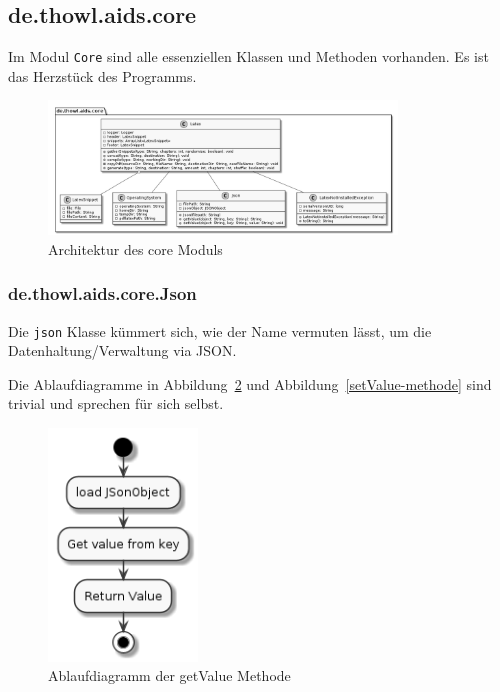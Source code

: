 \documentclass[stu, a4paper, 11pt, floatsintext]{apa7}
\begin{document}
\subsection{de.thowl.aids.core}
\noindent Im Modul \texttt{Core} sind alle essenziellen Klassen und Methoden vorhanden.
Es ist das Herzstück des Programms.

\begin{figure}[!htbp]
\centering
\includegraphics[width=350px]{../technical_documentation/diagramm/uml/flowcharts/core/core.png}
\caption{\label{Core Architektur}Architektur des core Moduls}
\end{figure}

\subsubsection{de.thowl.aids.core.Json}
\noindent Die \texttt{json} Klasse kümmert sich, wie der Name vermuten lässt, um die Datenhaltung/Verwaltung via JSON.

Die Ablaufdiagramme in Abbildung~\ref{getValue-methode} und Abbildung~\ref{setValue-methode} sind trivial und sprechen für sich selbst.

\begin{figure}[!htbp]
\centering
\includegraphics[width=150px]{../technical_documentation/diagramm/uml/flowcharts/core/json/getValue.png}
\caption{\label{getValue-methode}Ablaufdiagramm der getValue Methode}
\end{figure}
\end{document}
